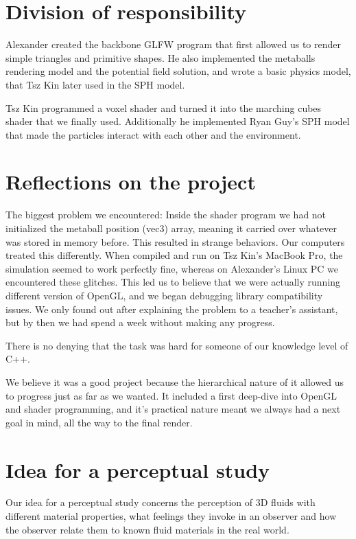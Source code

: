 \documentclass{article}
\begin{document}
\begin{multicols}{2}
    \section{Division of responsibility}

    Alexander created the backbone GLFW program that first allowed us to render simple triangles and primitive shapes. He also implemented the metaballs rendering model and the potential field solution, and wrote a basic physics model, that Tsz Kin later used in the SPH model.

    Tsz Kin programmed a voxel shader and turned it into the marching cubes shader that we finally used. Additionally he implemented Ryan Guy's SPH model that made the particles interact with each other and the environment.

    \section{Reflections on the project}

    The biggest problem we encountered:
    Inside the shader program we had not initialized the metaball position (vec3) array, meaning it carried over whatever was stored in memory before.
    This resulted in strange behaviors.
    Our computers treated this differently. When compiled and run on Tsz Kin's MacBook Pro, the simulation seemed to work perfectly fine, whereas on Alexander's Linux PC we encountered these glitches. This led us to believe that we were actually running different version of OpenGL, and we began debugging library compatibility issues. We only found out after explaining the problem to a teacher's assistant, but by then we had spend a week without making any progress.

    There is no denying that the task was hard for someone of our knowledge level of C++. 


    We believe it was a good project because the hierarchical nature of it allowed us to progress just as far as we wanted.
    It included a first deep-dive into OpenGL and shader programming, and it's practical nature meant we always had a next goal in mind, all the way to the final render.

    \section{Idea for a perceptual study}

        Our idea for a perceptual study concerns the perception of 3D fluids with different material properties, what feelings they invoke in an observer and how the observer relate them to known fluid materials in the real world.


\end{multicols}
\end{document}
